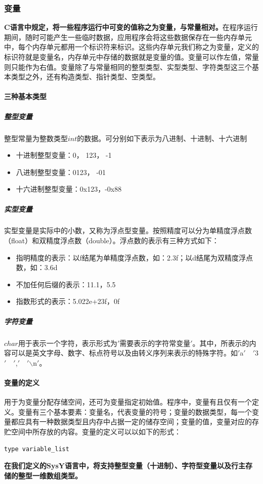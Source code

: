 \documentclass[UTF8,a4paper,10pt]{ctexart}
\begin{document}
\subsubsection{变量}
\textbf{C语言中规定，将一些程序运行中可变的值称之为变量，与常量相对。}在程序运行期间，随时可能产生一些临时数据，应用程序会将这些数据保存在一些内存单元中，每个内存单元都用一个标识符来标识。这些内存单元我们称之为变量，定义的标识符就是变量名，内存单元中存储的数据就是变量的值。\cite{bl}变量可以作左值，常量则只能作为右值。变量除了与常量相同的整型类型、实型类型、字符类型这三个基本类型之外，还有构造类型、指针类型、空类型。
\paragraph{三种基本类型}
\subparagraph{整型变量}
  整型常量为整数类型$int$的数据。可分别如下表示为八进制、十进制、十六进制
    \begin{itemize}
    \item 十进制整型变量：0， 123， -1
    \item 八进制整型变量：0123， -01
    \item 十六进制整型变量：0x123，-0x88
    \end{itemize}
  \subparagraph{实型变量} 实型变量是实际中的小数，又称为浮点型变量。按照精度可以分为单精度浮点数（float）和双精度浮点数（double）。浮点数的表示有三种方式如下：
    \begin{itemize}
    \item 指明精度的表示：以f结尾为单精度浮点数，如：2.3f；以d结尾为双精度浮点数，如：3.6d
    \item 不加任何后缀的表示：11.1，5.5
    \item 指数形式的表示：5.022e+23f，0f
    \end{itemize}
  \subparagraph{字符变量} $char$用于表示一个字符，表示形式为$'$需要表示的字符常变量$'$。其中，所表示的内容可以是英文字母、数字、标点符号以及由转义序列来表示的特殊字符。如$'$a$'$\ \  $'$3$'$\ \  $'$,$'$\ \  $'$$\backslash$n$'$。
\paragraph{变量的定义} 用于为变量分配存储空间，还可为变量指定初始值。程序中，变量有且仅有一个定义。\cite{m}变量有三个基本要素：变量名，代表变量的符号；变量的数据类型，每一个变量都应具有一种数据类型且内存中占据一定的储存空间；变量的值，变量对应的存贮空间中所存放的内容。变量的定义可以以如下的形式：
\begin{lstlisting}[language = c++]
type variable_list
\end{lstlisting}
\textbf{在我们定义的SysY语言中，将支持整型变量（十进制）、字符型变量以及行主存储的整型一维数组类型。}
\end{document}
